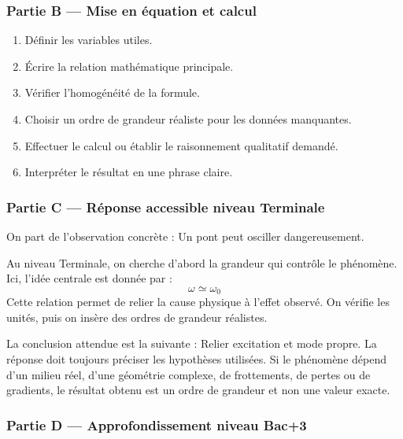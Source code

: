 \documentclass[11pt,a4paper]{article}
\begin{document}
\subsubsection*{Partie B — Mise en équation et calcul}

\begin{enumerate}
  \item Définir les variables utiles.
  \item Écrire la relation mathématique principale.
  \item Vérifier l'homogénéité de la formule.
  \item Choisir un ordre de grandeur réaliste pour les données manquantes.
  \item Effectuer le calcul ou établir le raisonnement qualitatif demandé.
  \item Interpréter le résultat en une phrase claire.
\end{enumerate}

\subsubsection*{Partie C — Réponse accessible niveau Terminale}

\begin{corrigebox}
On part de l'observation concrète : Un pont peut osciller dangereusement.

Au niveau Terminale, on cherche d'abord la grandeur qui contrôle le phénomène. Ici, l'idée centrale est donnée par :
\[
\omega\simeq\omega_0
\]
Cette relation permet de relier la cause physique à l'effet observé. On vérifie les unités, puis on insère des ordres de grandeur réalistes.

La conclusion attendue est la suivante : Relier excitation et mode propre. La réponse doit toujours préciser les hypothèses utilisées. Si le phénomène dépend d'un milieu réel, d'une géométrie complexe, de frottements, de pertes ou de gradients, le résultat obtenu est un ordre de grandeur et non une valeur exacte.
\end{corrigebox}

\subsubsection*{Partie D — Approfondissement niveau Bac+3}
\end{document}
